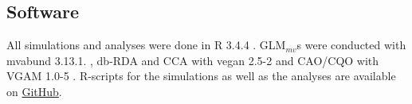 		
	\subsection{Software}
		All simulations and analyses were done in R 3.4.4 \citep{RCT2018}.
		GLM$_{mv}$s were conducted with mvabund 3.13.1. \citep{Wang2018}, db-RDA and CCA with vegan 2.5-2 \citep{Oksanen2018} and CAO/CQO with VGAM 1.0-5 \citep{Yee2018}. 
		R-scripts for the simulations as well as the analyses are available on \href{https://github.com/JonJup/Master-Thesis.git} {GitHub}.


